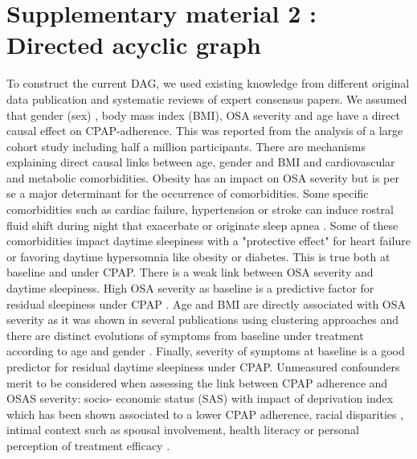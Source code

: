 \documentclass{article}
\begin{document}
\section*{Supplementary material 2 : Directed acyclic graph}
To construct the current DAG, we used existing knowledge from different original data publication and systematic reviews of expert consensus papers.
We assumed that gender (sex) \cite{pepinCPAPTherapyTermination2021a}, body mass index (BMI), OSA severity \cite{stepnowskyDoseresponseRelationshipCPAP2002} and age \cite{sabilCPAPDatabasedAlgorithm2021} have a direct causal effect on CPAP-adherence.
This was reported from the analysis of a large cohort study including half a million participants. 
There are mechanisms explaining direct causal links between age, gender and BMI and cardiovascular and metabolic comorbidities.
Obesity has an impact on OSA severity but is per se a major determinant for the occurrence of comorbidities.
Some specific comorbidities such as cardiac failure\cite{levySleepApnoeaHeart2021}, hypertension or stroke \cite{brownOvernightRostralFluid2021} can induce rostral fluid shift during night that exacerbate or originate sleep apnea \cite{javaheriSleepApneaTypes2017}.
Some of these comorbidities impact daytime sleepiness with a "protective effect" for heart failure\cite{arztSleepinessSleepPatients2006} or favoring daytime hypersomnia like obesity or diabetes.
This is true both at baseline and under CPAP\cite{koutsourelakisPredictorsResidualSleepiness2009}.
There is a weak link between OSA severity and daytime sleepiness\cite{bonsignoreExcessiveDaytimeSleepiness2021,mitraAssociationRiskFactors2021}.
High OSA severity as baseline is a predictive factor for residual sleepiness  under CPAP \cite{thorarinsdottirDifferentComponentsExcessive2021}.
Age and BMI are directly associated with OSA severity as it was shown in several publications using clustering approaches and there are distinct evolutions of symptoms from baseline under treatment according to age and gender \cite{baillyClustersSleepApnoea2021,gagnadouxRelationshipOSAClinical2016a,baillyObstructiveSleepApnea2016,holfingerDiagnosticPerformanceMachine2021}.
Finally, severity of symptoms at baseline is a good predictor for residual daytime sleepiness under CPAP\cite{gasaResidualSleepinessSleep2013a,bonsignoreExcessiveDaytimeSleepiness2021,koutsourelakisPredictorsResidualSleepiness2009}.
Unmeasured confounders merit to be considered when assessing the link between CPAP adherence and OSAS severity: socio- economic status (SAS) with impact of deprivation index which has been shown associated to a lower CPAP adherence\cite{daabekImpactHealthcareNonTakeUp2021,wickwireLowerSocioeconomicStatus2020,palmSocioeconomicFactorsAdherence2021}, racial disparities \cite{borkerNeighborhoodsGreaterPrevalence2021}, intimal context such as spousal involvement\cite{gentinaMaritalQualityPartner2019,mendelsonMultidimensionalEvaluationContinuous2020}, health literacy \cite{bakkerEthnicDisparitiesCPAP2011} or personal perception of treatment efficacy \cite{borriboonContinuousPositiveAirway2021}.
\end{document}
